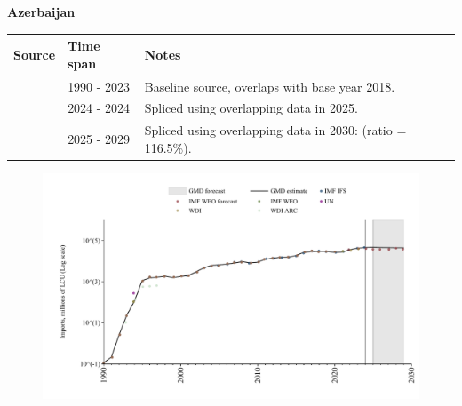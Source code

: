 \documentclass[12pt,a4paper,landscape]{article}
\begin{document}
\begin{adjustbox}{max totalsize={\paperwidth}{\paperheight},center}
\begin{minipage}[t][\textheight][t]{\textwidth}
\begin{figure}[H]
\end{figure}
\end{minipage}
\end{adjustbox}
\begin{adjustbox}{max totalsize={\paperwidth}{\paperheight},center}
\begin{minipage}[t][\textheight][t]{\textwidth}
\vspace*{0.5cm}
{}
\begin{center}
{\Large\bfseries Azerbaijan}
\end{center}
\vspace{0.5cm}
\begin{table}[H]
\centering
\small
\begin{tabular}{|l|l|l|}
\hline
\textbf{Source} & \textbf{Time span} & \textbf{Notes} \\
\hline
\rowcolor{white}\cite{WDI}& 1990 - 2023 &Baseline source, overlaps with base year 2018.\\
\rowcolor{lightgray}\cite{IMF_IFS}& 2024 - 2024 &Spliced using overlapping data in 2025.\\
\rowcolor{white}\cite{IMF_WEO_forecast}& 2025 - 2029 &Spliced using overlapping data in 2030: (ratio = 116.5\%).\\
\hline
\end{tabular}
\end{table}
\begin{figure}[H]
\centering
\includegraphics[width=\textwidth,height=0.6\textheight,keepaspectratio]{graphs/AZE_imports.pdf}
\end{figure}
\end{minipage}
\end{adjustbox}
\end{document}
